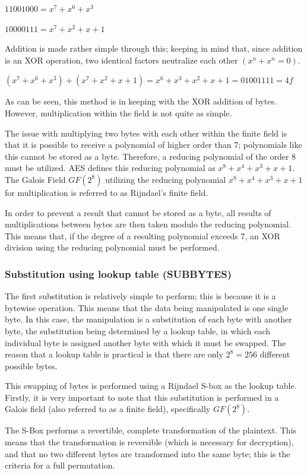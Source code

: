 \documentclass[12pt]{report}
\begin{document}
$11001000 = x^7+x^6+x^3$

$10000111 = x^7+x^2+x+1$

Addition is made rather simple through this; keeping in mind that, since addition is an XOR operation, two identical factors neutralize each other $(x^n+x^n = 0)$.

$(x^7+x^6+x^3)+(x^7+x^2+x+1) = x^6+x^3+x^2+x+1 = 01001111 = 4f$

As can be seen, this method is in keeping with the XOR addition of bytes. However, multiplication within the field is not quite as simple.

The issue with multiplying two bytes with each other within the finite field is that it is possible to receive a polynomial of higher order than 7; polynomials like this cannot be stored as a byte. Therefore, a reducing polynomial of the order 8 must be utilized. AES defines this reducing polynomial as $x^8+x^4+x^3+x+1$. The Galois Field $GF(2^8)$ utilizing the reducing polynomial $x^8+x^4+x^3+x+1$ for multiplication is referred to as Rijndael's finite field\cite{RFiniteField}.

In order to prevent a result that cannot be stored as a byte, all results of multiplications between bytes are then taken modulo the reducing polynomial. This means that, if the degree of a resulting polynomial exceeds 7, an XOR division using the reducing polynomial must be performed.

\subsubsection{Substitution using lookup table (SUBBYTES)}
The first substitution is relatively simple to perform; this is because it is a bytewise operation. This means that the data being manipulated is one single byte. In this case, the manipulation is a substitution of each byte with another byte, the substitution being determined by a lookup table, in which each individual byte is assigned another byte with which it must be swapped. The reason that a lookup table is practical is that there are only $2^8 = 256$ different possible bytes.

This swapping of bytes is performed using a Rijndael S-box as the lookup table. Firstly, it is very important to note that this substitution is performed in a Galois field (also referred to as a finite field)\cite{GaloisField}, specifically $GF(2^8)$.

The S-Box performs a revertible, complete transformation of the plaintext\cite{SBox}. This means that the transformation is reversible (which is necessary for decryption), and that no two different bytes are transformed into the same byte; this is the criteria for a full permutation.
\end{document}
